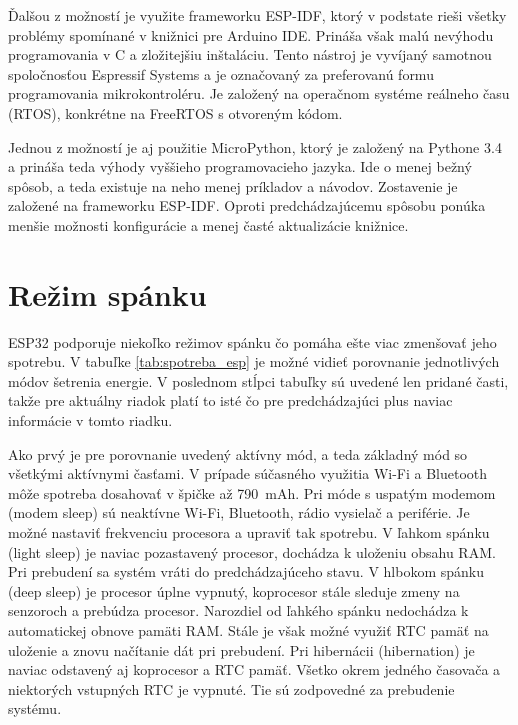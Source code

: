 Ďalšou z možností je využite frameworku ESP-IDF, ktorý v podstate rieši všetky problémy spomínané v knižnici pre Arduino IDE. Prináša však malú nevýhodu programovania v C a zložitejšiu inštaláciu. Tento nástroj je vyvíjaný samotnou spoločnosťou Espressif Systems a je označovaný za preferovanú formu programovania mikrokontroléru. Je založený na operačnom systéme reálneho času (RTOS), konkrétne na FreeRTOS s otvoreným kódom.

Jednou z možností je aj použitie MicroPython, ktorý je založený na Pythone 3.4 a prináša teda výhody vyššieho programovacieho jazyka. Ide o menej bežný spôsob, a teda existuje na neho menej príkladov a návodov. Zostavenie je založené na frameworku ESP-IDF. Oproti predchádzajúcemu spôsobu ponúka menšie možnosti konfigurácie a menej časté aktualizácie knižnice.

\section{Režim spánku}\label{sec:esp-sleep}

ESP32 podporuje niekoľko režimov spánku čo pomáha ešte viac zmenšovať jeho spotrebu. V tabuľke \ref{tab:spotreba_esp} je možné vidieť porovnanie jednotlivých módov šetrenia energie. V poslednom stĺpci tabuľky sú uvedené len pridané časti, takže pre aktuálny riadok platí to isté čo pre predchádzajúci plus naviac informácie v tomto riadku.

Ako prvý je pre porovnanie uvedený aktívny mód, a teda základný mód so všetkými aktívnymi časťami. V prípade súčasného využitia Wi-Fi a Bluetooth môže spotreba dosahovať v špičke až 790~mAh. Pri móde s uspatým modemom (modem sleep) sú neaktívne Wi-Fi, Bluetooth, rádio vysielač a periférie. Je možné nastaviť frekvenciu procesora a upraviť tak spotrebu. V ľahkom spánku (light sleep) je naviac pozastavený procesor, dochádza k uloženiu obsahu RAM. Pri prebudení sa systém vráti do predchádzajúceho stavu. V hlbokom spánku (deep sleep) je procesor úplne vypnutý, koprocesor stále sleduje zmeny na senzoroch a prebúdza procesor. Narozdiel od ľahkého spánku nedochádza k automatickej obnove pamäti RAM. Stále je však možné využiť RTC pamäť na uloženie a znovu načítanie dát pri prebudení. Pri hibernácii (hibernation) je naviac odstavený aj koprocesor a RTC pamäť. Všetko okrem jedného časovača a niektorých vstupných RTC je vypnuté. Tie sú zodpovedné za prebudenie systému.\cite{esp-sleep}

